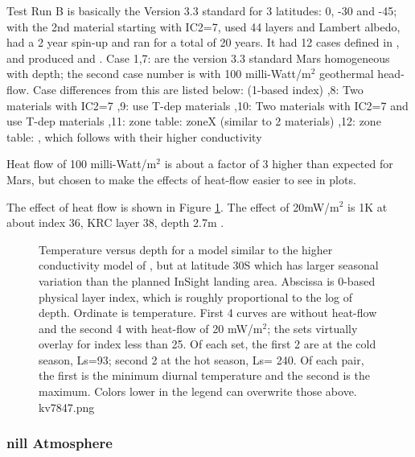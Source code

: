 \documentclass{article}
\begin{document}
Test Run B is basically the Version 3.3 standard for 3 latitudes: 0, -30 and
-45; with the 2nd material starting with IC2=7, used 44 layers and Lambert
albedo, had a 2 year spin-up and ran for a total of 20 years. It had 12 cases
defined in , and produced  and .
Case 1,7: are the version 3.3 standard Mars homogeneous with depth; the second
case number is with 100 milli-Watt/m$^2$ geothermal head-flow. Case differences
from this are listed below: (1-based index)
,8: Two materials with IC2=7
,9: use T-dep materials
,10: Two materials with IC2=7 and use T-dep materials
,11: zone table: zoneX (similar to 2 materials)
,12: zone table: , which follows  with their higher conductivity

Heat flow of 100 milli-Watt/m$^2$ is about a factor of 3 higher than expected for
Mars, but chosen to make the effects of heat-flow easier to see in plots.

The effect of heat flow is shown in Figure \ref{kv7847}. The effect of
20mW/m$^2$ is 1K at about index 36, KRC layer 38, depth 2.7m .

\begin{figure}[!ht] 
\caption[InSight with heat-flow]{Temperature versus depth for a model similar to
  the higher conductivity model of , but at latitude 30S which
  has larger seasonal variation than the planned InSight landing area.  Abscissa
  is 0-based physical layer index, which is roughly proportional to the log of
  depth. Ordinate is temperature. First 4 curves are without heat-flow and the
  second 4 with heat-flow of 20 mW/m$^2$; the sets virtually overlay for index
  less than 25. Of each set, the first 2 are at the cold season, Ls=93\qd;
  second 2 at the hot season, Ls= 240\qd. Of each pair, the first is the minimum
  diurnal temperature and the second is the maximum. Colors lower in the legend
  can overwrite those above.
\label{kv7847} kv7847.png  }
\end{figure} 

\subsubsection{nill Atmosphere} %
\end{document}
